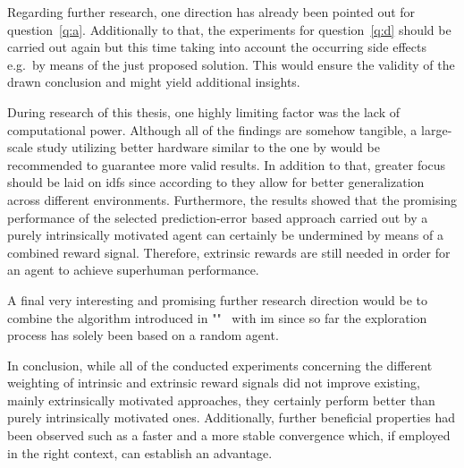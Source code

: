 \documentclass[draft,final]{vutinfth} %
\begin{document}
    Regarding further research, one direction has already been pointed out for question~\ref{q:a}.
    Additionally to that, the experiments for question~\ref{q:d} should be carried out again but this time taking into account the occurring side effects e.g.\ by means of the just proposed solution.
    This would ensure the validity of the drawn conclusion and might yield additional insights.

    During research of this thesis, one highly limiting factor was the lack of computational power.
    Although all of the findings are somehow tangible, a large-scale study utilizing better hardware similar to the one by \citet{burda_large-scale_2018-1} would be recommended to guarantee more valid results.
    In addition to that, greater focus should be laid on \glspl{idf} since according to \citet{burda_large-scale_2018-1} they allow for better generalization across different environments.
    Furthermore, the results showed that the promising performance of the selected prediction-error based approach carried out by a purely intrinsically motivated agent can certainly be undermined by means of a combined reward signal.
    Therefore, extrinsic rewards are still needed in order for an agent to achieve superhuman performance.

    A final very interesting and promising further research direction would be to combine the algorithm introduced in ""~\citep{ecoffet_go-explore_2019} with \gls{im} since so far the exploration process has solely been based on a random agent.

    In conclusion, while all of the conducted experiments concerning the different weighting of intrinsic and extrinsic reward signals did not improve existing, mainly extrinsically motivated approaches, they certainly perform better than purely intrinsically motivated ones.
    Additionally, further beneficial properties had been observed such as a faster and a more stable convergence which, if employed in the right context, can establish an advantage.

    \backmatter
    \listoffigures %

    \cleardoublepage %
    \listoftables %

    \listofalgorithms
\end{document}
